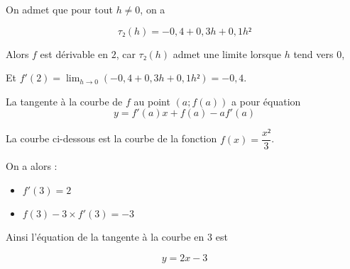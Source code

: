 \documentclass[
	classe=$1^{ere}STI2D$,
	headerTitle=Cours\space Chapitre\space 5
]{coursclass}
\begin{document}
\begin{exemple}
\begin{itemize}
		      On admet que pour tout $h ≠ 0$, on a

		      $$ τ₂(h) = -0,4 + 0,3h + 0,1h² $$

		      Alors $f$ est dérivable en $2$, car $τ₂(h)$ admet une limite lorsque $h$ tend vers $0$,

		      Et $f'(2) = \lim_{h→0}(-0,4 + 0,3h + 0,1h²) = -0,4$.
	\end{itemize}
\end{exemple}

\begin{propriete}
	La tangente à la courbe de $f$ au point $(a ; f(a))$ a pour équation
	$$ y = f'(a)x + f(a) - af'(a) $$
\end{propriete}

\begin{exemple}
	La courbe ci-dessous est la courbe de la fonction $f(x) = \dfrac{x²}{3}$.

	\begin{center}

	\end{center}

	On a alors :

	\begin{itemize}
		\item $f'(3) = 2$
		\item $f(3) - 3 × f'(3) = -3$
	\end{itemize}

	Ainsi l'équation de la tangente à la courbe en $3$ est

	$$ y = 2x - 3 $$
\end{exemple}
\end{document}
